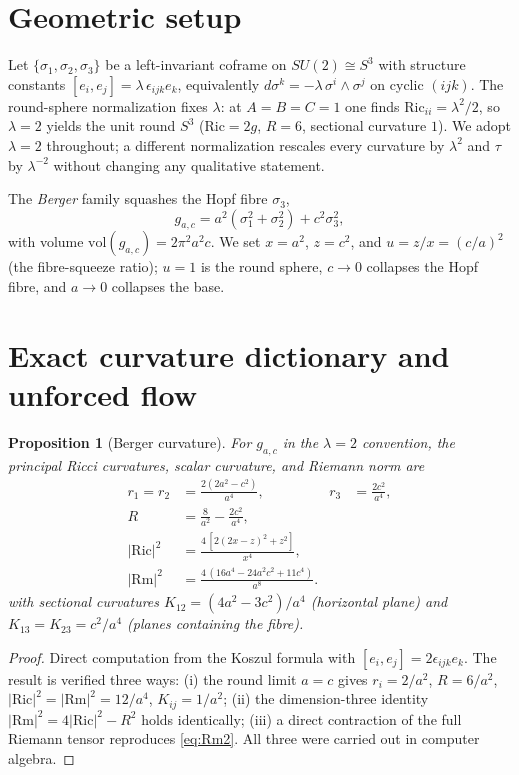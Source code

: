 \documentclass[aps,prd,twocolumn,superscriptaddress,nofootinbib,floatfix]{revtex4-2}
\theoremstyle{plain}
\newtheorem{proposition}{Proposition}
\theoremstyle{definition}
\newcommand{\Rm}{\mathrm{Rm}}
\newcommand{\Ric}{\mathrm{Ric}}
\begin{document}
\section{Geometric setup}\label{sec:setup}

Let $\{\sigma_1,\sigma_2,\sigma_3\}$ be a left-invariant coframe on $SU(2)\cong S^3$ with structure constants $[e_i,e_j]=\lambda\,\epsilon_{ijk}e_k$, equivalently $d\sigma^k=-\lambda\,\sigma^i\wedge\sigma^j$ on cyclic $(ijk)$. The round-sphere normalization fixes $\lambda$: at $A=B=C=1$ one finds $\Ric_{ii}=\lambda^2/2$, so $\lambda=2$ yields the unit round $S^3$ ($\Ric=2g$, $R=6$, sectional curvature $1$). We adopt $\lambda=2$ throughout; a different normalization rescales every curvature by $\lambda^2$ and $\tau$ by $\lambda^{-2}$ without changing any qualitative statement.

The \emph{Berger} family squashes the Hopf fibre $\sigma_3$,
\begin{equation}\label{eq:berger}
g_{a,c}=a^2(\sigma_1^2+\sigma_2^2)+c^2\sigma_3^2 ,
\end{equation}
with volume $\mathrm{vol}(g_{a,c})=2\pi^2 a^2 c$. We set $x=a^2$, $z=c^2$, and $u=z/x=(c/a)^2$ (the fibre-squeeze ratio); $u=1$ is the round sphere, $c\to0$ collapses the Hopf fibre, and $a\to0$ collapses the base.

\section{Exact curvature dictionary and unforced flow}\label{sec:curv}

\begin{proposition}[Berger curvature]\label{prop:curv}
For $g_{a,c}$ in the $\lambda=2$ convention, the principal Ricci curvatures, scalar curvature, and Riemann norm are
\begin{align}
r_1=r_2&=\frac{2(2a^2-c^2)}{a^4}, &
r_3&=\frac{2c^2}{a^4},\nonumber\\[2pt]
R&=\frac{8}{a^2}-\frac{2c^2}{a^4},\nonumber\\[2pt]
|\Ric|^2&=\frac{4\,[2(2x-z)^2+z^2]}{x^4},\nonumber\\[2pt]
|\Rm|^2&=\frac{4\,(16a^4-24a^2c^2+11c^4)}{a^8}. \label{eq:Rm2}
\end{align}
with sectional curvatures $K_{12}=(4a^2-3c^2)/a^4$ (horizontal plane) and $K_{13}=K_{23}=c^2/a^4$ (planes containing the fibre).
\end{proposition}

\begin{proof}
Direct computation from the Koszul formula with $[e_i,e_j]=2\epsilon_{ijk}e_k$. The result is verified three ways: (i) the round limit $a=c$ gives $r_i=2/a^2$, $R=6/a^2$, $|\Ric|^2=|\Rm|^2=12/a^4$, $K_{ij}=1/a^2$; (ii) the dimension-three identity $|\Rm|^2=4|\Ric|^2-R^2$ holds identically; (iii) a direct contraction of the full Riemann tensor reproduces \eqref{eq:Rm2}. All three were carried out in computer algebra.
\end{proof}
\end{document}
